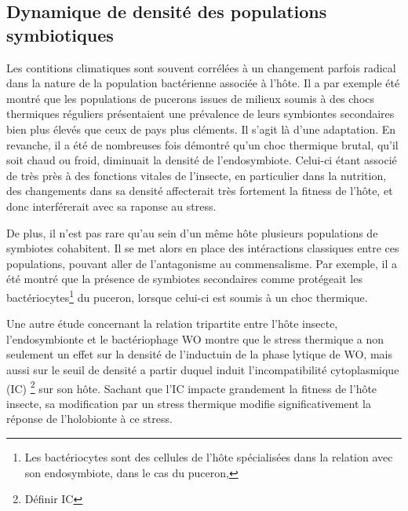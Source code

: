 \subsection{Dynamique de densité des populations symbiotiques} %
\label{sub:taillepop}

Les contitions climatiques sont souvent corrélées à un changement parfois
radical dans la nature de la population bactérienne associée à l'hôte. Il a
par exemple été montré \cite{harmon2009} que les populations de pucerons
issues de milieux soumis à des chocs thermiques réguliers présentaient une
prévalence de leurs symbiontes secondaires bien plus élevés que ceux de pays
plus cléments. 
Il s'agit là d'une adaptation.
En revanche, il a été de nombreuses fois démontré qu'un choc thermique brutal, qu'il soit chaud ou froid, diminuait la densité de l'endosymbiote.
Celui-ci étant associé de très près à des fonctions vitales de l'insecte, en particulier dans la nutrition, des changements dans sa densité affecterait très fortement la fitness de l'hôte, et donc interférerait avec sa raponse au stress.

De plus, il n'est pas rare qu'au sein d'un même hôte plusieurs populations de symbiotes
cohabitent.
Il se met alors en place des intéractions classiques entre ces
populations, pouvant aller de l'antagonisme au commensalisme. Par exemple, il
a été montré \cite{montllor2002} que la présence de symbiotes secondaires
comme  protégeait les bactériocytes\footnote{Les
bactériocytes sont des cellules de l'hôte spécialisées dans la relation avec
son endosymbiote, dans le cas du puceron, } du puceron,
lorsque celui-ci est soumis à un choc thermique.

Une autre étude \cite{bordenstein2011} concernant la relation tripartite entre l'hôte insecte, l'endosymbionte  et le bactériophage WO montre que le stress thermique a non seulement un effet sur la densité de  l'inductuin de la phase lytique de WO, mais aussi sur le seuil de densité a partir duquel  induit l'incompatibilité cytoplasmique (IC)%
\footnote{Définir IC} sur son hôte.
Sachant que l'IC impacte grandement la fitness de l'hôte insecte, sa modification par un stress thermique modifie significativement la réponse de l'holobionte à ce stress.


